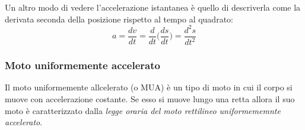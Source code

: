 \documentclass[11pt]{article}
\begin{document}
Un altro modo di vedere l'accelerazione istantanea è quello di descriverla come la derivata seconda della posizione rispetto al tempo al quadrato:
\begin{equation}
 a= \dfrac{dv}{dt}= \dfrac{d}{dt}\Bigg( \dfrac{ds}{dt}\Bigg) = \dfrac{d^2s}{dt^2}
 \end{equation} 

\subsubsection{Moto uniformemente accelerato}
Il moto uniformemente allcelerato (o MUA) è un tipo di moto in cui il corpo si muove con accelerazione costante. Se esso si muove lungo una retta allora il suo moto è caratterizzato dalla \textit{legge oraria del moto rettilineo uniformememnte accelerato}.
\end{document}
